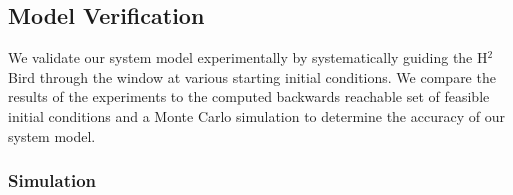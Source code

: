 \documentclass{aamas2013}
\begin{document}
\subsection{Model Verification}

We validate our system model experimentally by systematically guiding the
H$^2$Bird through the window at various starting initial conditions. We
compare the results of the experiments to the computed backwards reachable set
of feasible initial conditions and a Monte Carlo simulation to determine the
accuracy of our system model.

\subsubsection{Simulation}
\end{document}
